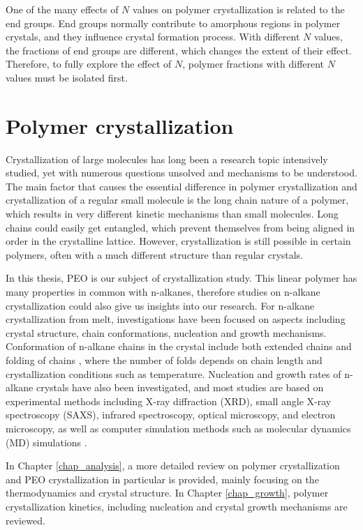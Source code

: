 One of the many effects of $N$ values on polymer crystallization is related to the end groups. End groups normally contribute to amorphous regions in polymer crystals, and they influence crystal formation process. With different $N$ values, the fractions of end groups are different, which changes the extent of their effect. Therefore, to fully explore the effect of $N$, polymer fractions with different $N$ values must be isolated first.

\section{Polymer crystallization}

Crystallization of large molecules has long been a research topic intensively studied, yet with numerous questions unsolved and mechanisms to be understood. The main factor that causes the essential difference in polymer crystallization and crystallization of a regular small molecule is the long chain nature of a polymer, which results in very different kinetic mechanisms than small molecules. Long chains could easily get entangled, which prevent themselves from being aligned in order in the crystalline lattice. However, crystallization is still possible in certain polymers, often with a much different structure than regular crystals.

In this thesis, PEO is our subject of crystallization study. This linear polymer has many properties in common with n-alkanes, therefore studies on n-alkane crystallization could also give us insights into our research. For n-alkane crystallization from melt, investigations have been focused on aspects including crystal structure, chain conformations, nucleation and growth mechanisms. Conformation of n-alkane chains in the crystal include both extended chains and folding of chains \cite{Organ1993,Alamo1993}, where the number of folds depends on chain length and crystallization conditions such as temperature. Nucleation and growth rates of n-alkane crystals have also been investigated, and most studies are based on experimental methods including X-ray diffraction (XRD), small angle X-ray spectroscopy (SAXS), infrared spectroscopy, optical microscopy, and electron microscopy, as well as computer simulation methods such as molecular dynamics (MD) simulations \cite{Anwar2013,Yamamoto2016}.

In Chapter \ref{chap_analysis}, a more detailed review on polymer crystallization and PEO crystallization in particular is provided, mainly focusing on the thermodynamics and crystal structure. In Chapter \ref{chap_growth}, polymer crystallization kinetics, including nucleation and crystal growth mechanisms are reviewed.
